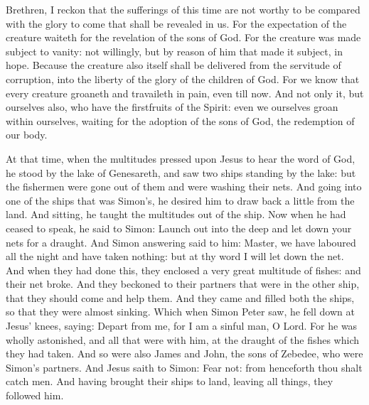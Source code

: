 \begin{multicols}{2}


\bigskip



Brethren, I reckon that the sufferings of this time are not worthy to be
compared with the glory to come that shall be revealed in us.
For the expectation of the creature waiteth for the revelation of
the sons of God.
For the creature was made subject to vanity: not willingly, but by
reason of him that made it subject, in hope.
Because the creature also itself shall be delivered from the
servitude of corruption, into the liberty of the glory of the children
of God.
For we know that every creature groaneth and travaileth in pain,
even till now.
And not only it, but ourselves also, who have the firstfruits of
the Spirit: even we ourselves groan within ourselves, waiting for the
adoption of the sons of God, the redemption of our body.



At that time, when the multitudes pressed upon Jesus to
hear the word of God, he stood by the lake of Genesareth,
and saw two ships standing by the lake: but the fishermen were gone
out of them and were washing their nets.
And going into one of the ships that was Simon's, he desired him to
draw back a little from the land. And sitting, he taught the multitudes
out of the ship.
Now when he had ceased to speak, he said to Simon: Launch out into
the deep and let down your nets for a draught.
And Simon answering said to him: Master, we have laboured all the
night and have taken nothing: but at thy word I will let down the net.
And when they had done this, they enclosed a very great multitude
of fishes: and their net broke.
And they beckoned to their partners that were in the other ship,
that they should come and help them. And they came and filled both the
ships, so that they were almost sinking.
Which when Simon Peter saw, he fell down at Jesus' knees, saying:
Depart from me, for I am a sinful man, O Lord.
For he was wholly astonished, and all that were with him, at the
draught of the fishes which they had taken.
And so were also James and John, the sons of Zebedee, who were
Simon's partners. And Jesus saith to Simon: Fear not: from henceforth
thou shalt catch men.
And having brought their ships to land, leaving all things, they
followed him.




\end{multicols}
